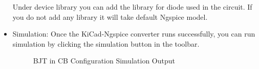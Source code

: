\begin{itemize}
Under device library you can add the library for diode used in the circuit. If you do not add any library it will take default Ngspice model.


\item Simulation: Once the KiCad-Ngspice converter runs successfully, you can run simulation by clicking the simulation button in the toolbar.
\begin{figure}[!htp]
    \centering
     \hfill
    \caption{BJT in CB Configuration Simulation Output}
\end{figure}


\end{itemize}
